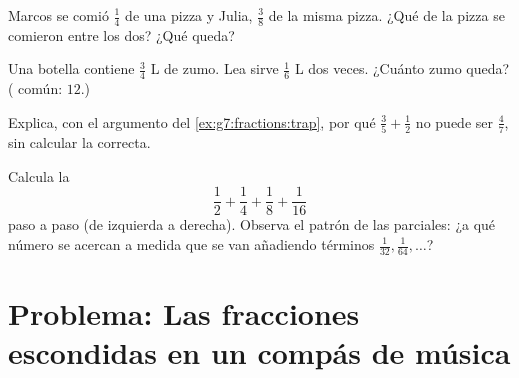 \begin{exercise}[$\star\star$]\label{exo:g7:fractions:9}
Marcos se comió $\frac14$ de una pizza y Julia, $\frac38$ de la misma pizza.
¿Qué  de la pizza se comieron entre los dos? ¿Qué 
queda?
\end{exercise}

\begin{exercise}[$\star\star$]\label{exo:g7:fractions:10}
Una botella contiene $\frac34$ L de zumo. Lea sirve $\frac16$ L
dos veces. ¿Cuánto zumo queda? ( común: $12$.)
\end{exercise}

\begin{exercise}[$\star\star$]\label{exo:g7:fractions:11}
Explica, con el argumento del \cref{ex:g7:fractions:trap}, por qué
$\frac35 + \frac12$ no puede ser $\frac{4}{7}$, sin calcular la
 correcta.
\end{exercise}

\begin{exercise}[$\star\star\star$]\label{exo:g7:fractions:12}
Calcula la 
\[
\frac12 + \frac14 + \frac18 + \frac{1}{16}
\]
paso a paso (de izquierda a derecha). Observa el patrón de las  parciales:
¿a qué número se acercan a medida que se van añadiendo términos
$\frac{1}{32}, \frac{1}{64}, \dots$?
\end{exercise}

\section{Problema: Las fracciones escondidas en un compás de música}

